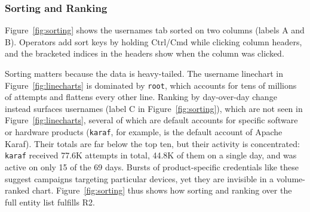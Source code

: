 \documentclass[10pt,twocolumn]{article}   %
\begin{document}
\subsubsection{Sorting and Ranking}
\label{sec:sorting}



Figure~\ref{fig:sorting} shows the usernames tab sorted on two columns (labels A and B). Operators add sort keys by holding Ctrl/Cmd while clicking column headers, and the bracketed 
indices in the headers show when the column was clicked. 

Sorting matters because the data is heavy-tailed. The username linechart in Figure~\ref{fig:linecharts} is dominated by \texttt{root}, 
which accounts for tens of 
millions of attempts and flattens every other line. Ranking by day-over-day change instead surfaces usernames (label C in Figure~\ref{fig:sorting}), which are
not seen in Figure~\ref{fig:linecharts}, several of which are default accounts for specific software or hardware products (\texttt{karaf}, for 
example, is the 
default account of Apache Karaf). Their totals are far below the top ten, but their activity is concentrated: \texttt{karaf} received 
77.6K attempts in total, 
44.8K of them on a single day, and was active on only 15 of the 69 days. Bursts of product-specific credentials like these suggest campaigns targeting particular 
devices, yet they are invisible in a volume-ranked chart. Figure~\ref{fig:sorting} thus shows how sorting and ranking over the full entity list fulfills R2.





 

 
\end{document}
